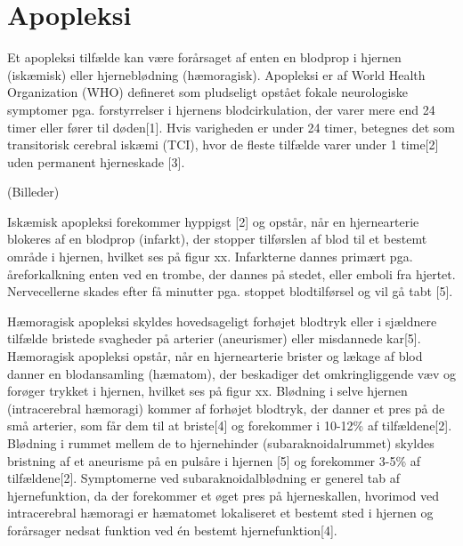 \section{Apopleksi}

Et apopleksi tilfælde kan være forårsaget af enten en blodprop i hjernen (iskæmisk) eller hjerneblødning (hæmoragisk).
Apopleksi er af World Health Organization (WHO) defineret som pludseligt opstået fokale neurologiske symptomer pga. forstyrrelser i hjernens blodcirkulation, der varer mere end 24 timer eller fører til døden[1]. Hvis varigheden er under 24 timer, betegnes det som transitorisk cerebral iskæmi (TCI), hvor de fleste tilfælde varer under 1 time[2] uden permanent hjerneskade [3].

(Billeder)

Iskæmisk apopleksi forekommer hyppigst%
[2] og opstår, når en hjernearterie blokeres af en blodprop (infarkt), der stopper tilførslen af blod til et bestemt område i hjernen, hvilket ses på figur xx. Infarkterne dannes primært pga. åreforkalkning enten ved en trombe, der dannes på stedet, eller emboli fra hjertet. Nervecellerne skades efter få minutter pga. stoppet blodtilførsel og vil gå tabt [5].

Hæmoragisk apopleksi skyldes hovedsageligt forhøjet blodtryk eller i sjældnere tilfælde bristede svagheder på arterier (aneurismer) eller misdannede kar[5]. Hæmoragisk apopleksi opstår, når en hjernearterie brister og lækage af blod danner en blodansamling (hæmatom), der beskadiger det omkringliggende væv og forøger trykket i hjernen, hvilket ses på figur xx. Blødning i selve hjernen (intracerebral hæmoragi) kommer af forhøjet blodtryk, der danner et pres på de små arterier, som får dem til at briste[4] og forekommer i 10-12\% af tilfældene[2]. %
Blødning i rummet mellem de to hjernehinder (subaraknoidalrummet) skyldes bristning af et aneurisme på en pulsåre i hjernen [5] og forekommer 3-5\% af tilfældene[2]. Symptomerne ved subaraknoidalblødning er generel tab af hjernefunktion, da der forekommer et øget pres på hjerneskallen, hvorimod ved intracerebral hæmoragi er hæmatomet lokaliseret et bestemt sted i hjernen og forårsager nedsat funktion ved én bestemt hjernefunktion[4]. 

